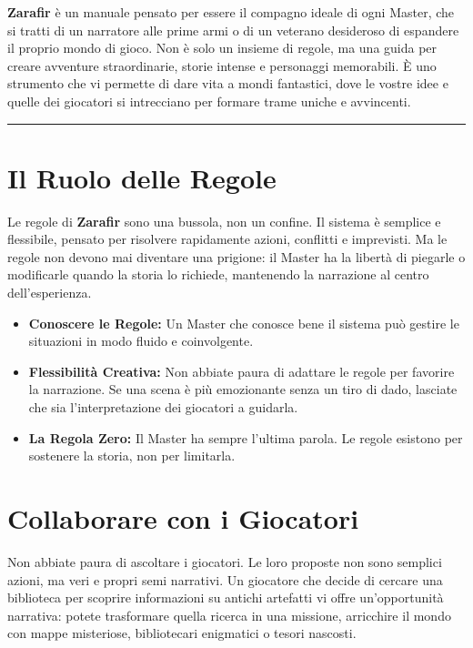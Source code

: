 \documentclass[../manuale_main.tex]{subfiles}
\begin{document}
\textbf{Zarafir} è un manuale pensato per essere il compagno ideale di ogni Master, che si tratti di un narratore alle prime armi o di un veterano desideroso di espandere il proprio mondo di gioco. Non è solo un insieme di regole, ma una guida per creare avventure straordinarie, storie intense e personaggi memorabili. È uno strumento che vi permette di dare vita a mondi fantastici, dove le vostre idee e quelle dei giocatori si intrecciano per formare trame uniche e avvincenti.

\vspace{0.5cm}
\noindent
\begin{center}
\rule{\textwidth}{0.4pt} 
\end{center}
\vspace{0.5cm}

\section*{Il Ruolo delle Regole}
Le regole di \textbf{Zarafir} sono una bussola, non un confine. Il sistema è semplice e flessibile, pensato per risolvere rapidamente azioni, conflitti e imprevisti. Ma le regole non devono mai diventare una prigione: il Master ha la libertà di piegarle o modificarle quando la storia lo richiede, mantenendo la narrazione al centro dell’esperienza.

\begin{itemize}
\item \textbf{Conoscere le Regole:} Un Master che conosce bene il sistema può gestire le situazioni in modo fluido e coinvolgente.
\item \textbf{Flessibilità Creativa:} Non abbiate paura di adattare le regole per favorire la narrazione. Se una scena è più emozionante senza un tiro di dado, lasciate che sia l'interpretazione dei giocatori a guidarla.
\item \textbf{La Regola Zero:} Il Master ha sempre l'ultima parola. Le regole esistono per sostenere la storia, non per limitarla.
\end{itemize}

\vspace{0.3cm}

\section*{Collaborare con i Giocatori}
Non abbiate paura di ascoltare i giocatori. Le loro proposte non sono semplici azioni, ma veri e propri semi narrativi. Un giocatore che decide di cercare una biblioteca per scoprire informazioni su antichi artefatti vi offre un'opportunità narrativa: potete trasformare quella ricerca in una missione, arricchire il mondo con mappe misteriose, bibliotecari enigmatici o tesori nascosti.
\end{document}

